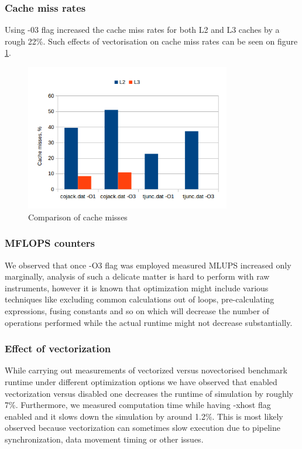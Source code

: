 \documentclass{article}
\begin{document}
\subsubsection{Cache miss rates}
Using -03 flag increased the cache miss rates for both L2 and L3 caches by a rough 22\%. Such effects of vectorisation on cache miss rates can be seen on figure \ref{fig:2}.
\begin{figure}[h!]
	\begin{center}
		\includegraphics[width=0.8\textwidth]{cache-misses}
		\caption{Comparison of cache misses}
		\label{fig:2}
	\end{center}
\end{figure}

\subsubsection{MFLOPS counters}
We observed that once -O3 flag was employed measured MLUPS increased only marginally, analysis of such a delicate matter is hard to perform with raw instruments, however it is known that optimization might include various techniques like excluding common calculations out of loops, pre-calculating expressions, fusing constants and so on which will decrease the number of operations performed while the actual runtime might not decrease substantially.

\subsubsection{Effect of vectorization}
While carrying out measurements of vectorized versus novectorised benchmark runtime under different optimization options we have observed that enabled vectorization versus disabled one decreases the runtime of simulation by roughly 7\%. Furthermore, we measured computation time while having -xhost flag enabled and it slows down the simulation by around 1.2\%. This is most likely observed because vectorization can sometimes slow execution due to pipeline synchronization, data movement timing or other issues.
\end{document}
